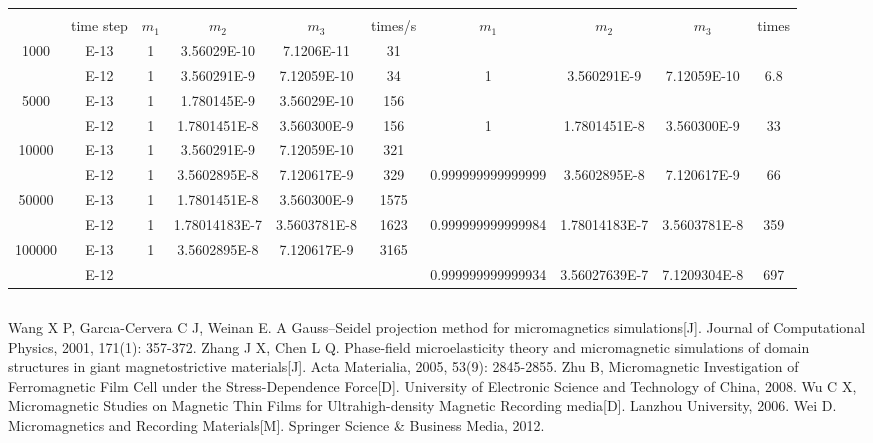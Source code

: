 \documentclass{article}
\begin{document}
\section{}
\begin{sidewaystable}[h]
	\centering
	\begin{tabular}{|c|c|ccc|c|ccc|c|}
		&  &  &  &  &  &  &  &  &  \\ 
		& time step & $m_1$ & $m_2$ & $m_3$ & times/s & $m_1$ & $m_2$ & $m_3$ & times \\ 
		1000 & E-13 & 1 & 3.56029E-10 & 7.1206E-11 & 31 &  &  &  &  \\ 
		& E-12 & 1 & 3.560291E-9 & 7.12059E-10 & 34 & 1 & 3.560291E-9 & 7.12059E-10 & 6.8 \\ 
		5000 & E-13 & 1 & 1.780145E-9 & 3.56029E-10 & 156 &  &  &  &  \\ 
		& E-12 & 1 & 1.7801451E-8 & 3.560300E-9 & 156 & 1 & 1.7801451E-8 & 3.560300E-9 & 33 \\ 
		10000 & E-13 & 1 & 3.560291E-9 & 7.12059E-10 & 321 &  &  &  &  \\ 
		& E-12 & 1 & 3.5602895E-8 & 7.120617E-9 & 329 & 0.999999999999999 & 3.5602895E-8 & 7.120617E-9 & 66 \\ 
		50000 & E-13 & 1 & 1.7801451E-8 & 3.560300E-9 & 1575 &  &  &  &  \\ 
		& E-12 & 1 & 1.78014183E-7 & 3.5603781E-8 & 1623 & 0.999999999999984 & 1.78014183E-7 & 3.5603781E-8 & 359 \\ 
		100000 & E-13 & 1 & 3.5602895E-8 & 7.120617E-9 & 3165 &  &  &  &  \\ 
		& E-12 &  &  &  &  & 0.999999999999934 & 3.56027639E-7 & 7.1209304E-8 & 697 \\ 
	\end{tabular} 
\end{sidewaystable}
\subsection{}
\begin{thebibliography}{99}
 Wang X P, Garcıa-Cervera C J, Weinan E. A Gauss–Seidel projection method for micromagnetics simulations[J]. Journal of Computational Physics, 2001, 171(1): 357-372.
 Zhang J X, Chen L Q. Phase-field microelasticity theory and micromagnetic simulations of domain structures in giant magnetostrictive materials[J]. Acta Materialia, 2005, 53(9): 2845-2855.
 Zhu B, Micromagnetic Investigation of Ferromagnetic Film Cell under the Stress-Dependence Force[D]. University of Electronic Science and Technology of China, 2008.
 Wu C X, Micromagnetic Studies on Magnetic Thin Films for Ultrahigh-density Magnetic Recording media[D]. Lanzhou University, 2006.
 Wei D. Micromagnetics and Recording Materials[M]. Springer Science \& Business Media, 2012.
\end{thebibliography}
\end{document}
